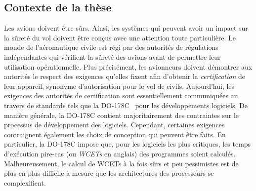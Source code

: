 \documentclass[main.tex]{subfiles}
\begin{document}
\subsection{Contexte de la thèse}
Les avions doivent être sûrs. Ainsi, les systèmes qui peuvent avoir un impact sur la sûreté du vol doivent être conçus avec une attention toute particulière. Le monde de l'aéronautique civile est régi par des autorités de régulations indépendantes qui vérifient la sûreté des avions avant de permettre leur utilisation opérationnelle. Plus précisément, les avionneurs doivent démontrer aux autorités le respect des exigences qu'elles fixent afin d'obtenir la \emph{certification} de leur appareil, synonyme d'autorisation pour le vol de civils. Aujourd'hui, les exigences des autorités de certification sont essentiellement communiquées au travers de standards tels que la DO-178C~\cite{do178} pour les développements logiciels. De manière générale, la DO-178C contient majoritairement des contraintes sur le processus de développement des logiciels. Cependant, certaines exigences contraignent également les choix de conception qui peuvent être faits. En particulier, la DO-178C impose que, pour les logiciels les plus critiques, les temps d'exécution pire-cas (ou \emph{WCETs} en anglais) des programmes soient calculés. Malheureusement, le calcul de WCETs à la fois sûrs et peu pessimistes est de plus en plus difficile à mesure que les architectures des processeurs se complexifient.
\end{document}

